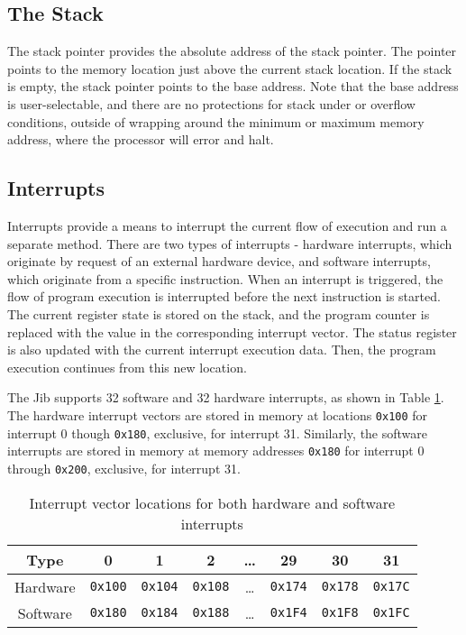 \documentclass{article}
\begin{document}
\subsection{The Stack}
\label{sec:the-stack}

The stack pointer provides the absolute address of the stack pointer. The pointer points to the memory location just above the current stack location. If the stack is empty, the stack pointer points to the base address. Note that the base address is user-selectable, and there are no protections for stack under or overflow conditions, outside of wrapping around the minimum or maximum memory address, where the processor will error and halt.

\subsection{Interrupts}

Interrupts provide a means to interrupt the current flow of execution and run a separate method. There are two types of interrupts - hardware interrupts, which originate by request of an external hardware device, and software interrupts, which originate from a specific instruction. When an interrupt is triggered, the flow of program execution is interrupted before the next instruction is started. The current register state is stored on the stack, and the program counter is replaced with the value in the corresponding interrupt vector. The status register is also updated with the current interrupt execution data. Then, the program execution continues from this new location.

The Jib supports 32 software and 32 hardware interrupts, as shown in Table \ref{table:interrupt-vector-locations}. The hardware interrupt vectors are stored in memory at locations \texttt{0x100} for interrupt 0 though \texttt{0x180}, exclusive, for interrupt 31. Similarly, the software interrupts are stored in memory at memory addresses \texttt{0x180} for interrupt 0 through \texttt{0x200}, exclusive, for interrupt 31.

\begin{table}[h!]
    \centering
    \begin{tabular}{c|ccccccc}
        \hline
        Type & 0 & 1 & 2 & \dots & 29 & 30 & 31 \\
        \hline
        Hardware & \texttt{0x100} & \texttt{0x104} & \texttt{0x108} & \dots & \texttt{0x174} & \texttt{0x178} & \texttt{0x17C} \\
        Software & \texttt{0x180} & \texttt{0x184} & \texttt{0x188} & \dots & \texttt{0x1F4} & \texttt{0x1F8} & \texttt{0x1FC} \\
        \hline
    \end{tabular}
    \caption{Interrupt vector locations for both hardware and software interrupts}
    \label{table:interrupt-vector-locations}
\end{table}
\end{document}

